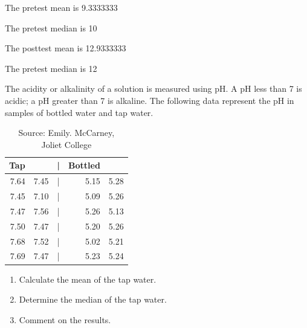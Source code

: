 \documentclass[11pt, chapterprefix=true]{scrbook}\usepackage[]{graphicx}\usepackage[]{color}
\begin{document}
\begin{exercises}
\begin{solution}
	The pretest mean is  9.3333333


	The pretest median is 10


	The posttest mean is	12.9333333


The pretest median is 12

	\end{solution}
	
	\begin{exercise}   %

	The acidity or alkalinity of a solution is measured using pH.  A pH less than 7 is acidic; a pH greater than 7 is alkaline.  The following data represent the pH in samples of bottled water and tap water.

\begin{table}[ht]
 \centering
 
	{\small{             %
	\caption{Source: Emily. McCarney, \\ Joliet College}
 \begin{tabular}{@{} rrcrr @{}}
   Tap &  & | & Bottled  & \\ \hline  
   7.64 & 7.45 & | & 5.15 & 5.28 \\
   7.45 & 7.10 & | & 5.09 & 5.26 \\
   7.47 & 7.56 & | & 5.26 & 5.13 \\
   7.50 & 7.47 & | & 5.20 & 5.26 \\
   7.68 & 7.52 & | & 5.02 & 5.21 \\
   7.69 & 7.47 & | & 5.23 & 5.24 \\
    \hline
 \end{tabular}
 }}
   \label{tab:t3_15}
 \end{table}

\begin{enumerate}
 \item Calculate the mean  of the tap water.
 \item Determine the median of the tap water.
 \item Comment on the results.
\end{enumerate} 
  \end{exercise}
%   
%   

\end{exercises}

\onecolumn
\end{document}

